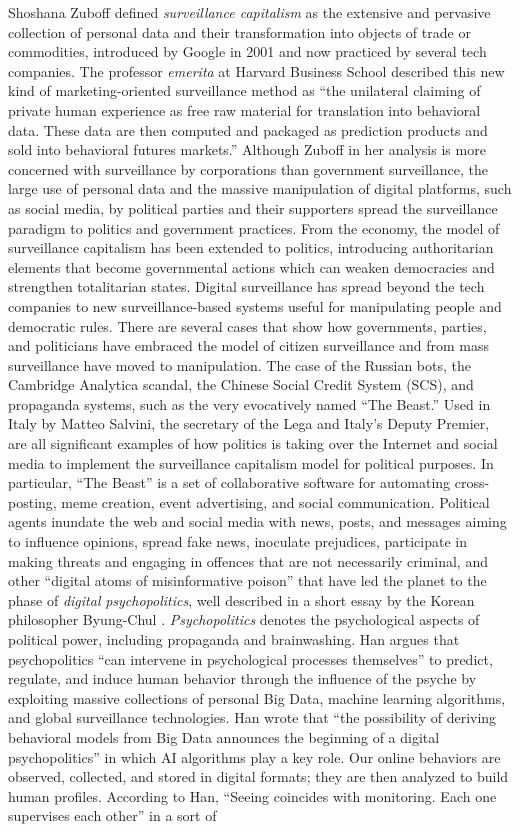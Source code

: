 Shoshana Zuboff defined \textit{surveillance capitalism} as the extensive and pervasive collection of personal data and their transformation into objects of trade or commodities, introduced by Google in 2001 and now practiced by several tech companies. The professor \textit{emerita} at Harvard Business School described this new kind of marketing-oriented surveillance method as ``the unilateral claiming of private human experience as free raw material for translation into behavioral data. These data are then computed and packaged as prediction products and sold into behavioral futures markets.'' Although Zuboff in her analysis is more concerned with surveillance by corporations than government surveillance, the large use of personal data and the massive manipulation of digital platforms, such as social media, by political parties and their supporters spread the surveillance paradigm to politics and government practices. From the economy, the model of surveillance capitalism has been extended to politics, introducing authoritarian elements that become governmental actions which can weaken democracies and strengthen totalitarian states. Digital surveillance has spread beyond the tech companies to new surveillance-based systems useful for manipulating people and democratic rules. There are several cases that show how governments, parties, and politicians have embraced the model of citizen surveillance and from mass surveillance have moved to manipulation. The case of the Russian bots, the Cambridge Analytica scandal, the Chinese Social Credit System (SCS), and propaganda systems, such as the very evocatively named ``The Beast.'' Used in Italy by Matteo Salvini, the secretary of the Lega and Italy's Deputy Premier, are all significant examples of how politics is taking over the Internet and social media to implement the surveillance capitalism model for political purposes. In particular, ``The Beast'' is a set of collaborative software for automating cross-posting, meme creation, event advertising, and social communication. Political agents inundate the web and social media with news, posts, and messages aiming to influence opinions, spread fake news, inoculate prejudices, participate in making threats and engaging in offences that are not necessarily criminal, and other ``digital atoms of misinformative poison'' that have led the planet to the phase of \textit{digital} \textit{psychopolitics}, well described in a short essay by the Korean philosopher Byung-Chul \citet{chap:9:Han:2017}. \textit{Psychopolitics} denotes the psychological aspects of political power, including propaganda and brainwashing. Han argues that psychopolitics ``can intervene in psychological processes themselves'' to predict, regulate, and induce human behavior through the influence of the psyche by exploiting massive collections of personal Big Data, machine learning algorithms, and global surveillance technologies. Han wrote that ``the possibility of deriving behavioral models from Big Data announces the beginning of a digital psychopolitics'' in which AI algorithms play a key role. Our online behaviors are observed, collected, and stored in digital formats; they are then analyzed to build human profiles. According to Han, ``Seeing coincides with monitoring. Each one supervises each other'' in a sort of 
